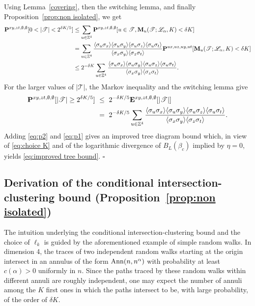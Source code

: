 \documentclass[a4paper,oneside,11pt]{article}
\numberwithin{equation}{section}
\numberwithin{equation}{section}
\numberwithin{equation}{section}
\newcommand{\calT}{\mathcal{T}}
\newcommand{\bbZ}{\mathbb{Z}}
\begin{document}
Using Lemma~\ref{covering}, then the switching lemma, and finally Proposition~\ref{prop:non isolated}, we get 
\begin{align} 
{\bf P}^{xy,zt,\emptyset,\emptyset}[0<|\calT|< 2^{\delta K/5}]
&\le \sum_{u\in \bbZ^4}{\bf P}^{xy,zt,\emptyset,\emptyset}[u\in \calT,{\bf M}_{u}(\calT; \mathcal L_\alpha, K)< \delta K]\nonumber\\
&= \sum_{u\in \bbZ^4}\frac{\langle\sigma_u\sigma_x\rangle\langle\sigma_u\sigma_y\rangle\langle\sigma_u\sigma_z\rangle\langle\sigma_u\sigma_t\rangle}{\langle\sigma_x\sigma_y\rangle\langle\sigma_z\sigma_t\rangle}{\bf P}^{ux,uz,uy,ut}[{\bf M}_{u}(\calT; \mathcal L_\alpha, K)< \delta K]\nonumber \\
&\le 2^{-\delta K} \sum_{u\in \bbZ^4}\frac{\langle\sigma_u\sigma_x\rangle\langle\sigma_u\sigma_y\rangle\langle\sigma_u\sigma_z\rangle\langle\sigma_u\sigma_t\rangle}{\langle\sigma_x\sigma_y\rangle\langle\sigma_z\sigma_t\rangle}.  \label{eq:p2}
\end{align}
For the larger values of $|\calT|$, the Markov inequality and the switching lemma give
\begin{align} {\bf P}^{xy,zt,\emptyset,\emptyset}[|\calT|\ge2^{\delta K/5}]
&~\leq~ 2^{-\delta K/5}{\bf E}^{xy,zt,\emptyset,\emptyset}[|\calT|] \notag \\ 
&~=~2^{-\delta K/5}\sum_{u\in \bbZ^4}\frac{\langle\sigma_u\sigma_x\rangle\langle\sigma_u\sigma_y\rangle\langle\sigma_u\sigma_z\rangle\langle\sigma_u\sigma_t\rangle}{\langle\sigma_x\sigma_y\rangle\langle\sigma_z\sigma_t\rangle}.\label{eq:p1}
\end{align} 
Adding \eqref{eq:p2} and \eqref{eq:p1} gives an improved tree diagram bound which, in view of \eqref{eq:choice K} and of the logarithmic divergence of $B_L(\beta_c)$ implied by $\eta=0$, yields \eqref{eq:improved tree bound}.  
\mbox{} \hfill\ensuremath{\square}

\subsection{Derivation of the conditional intersection-clustering bound (Proposition~\ref{prop:non isolated})} \label{sec:2.2}

The intuition underlying  the conditional intersection-clustering bound and the choice of $\ell_k$ is guided by the aforementioned  example of simple random walks. In dimension 4, the traces of two independent random walks starting at the origin intersect in an annulus of the form ${\rm Ann}(n,n^{\alpha})$ with probability at least $c(\alpha)>0$ uniformly in $n$.   Since the paths traced by these random walks within different annuli are roughly independent, one may expect the number of annuli among the $K$ first ones in which the paths intersect to be,  with large probability, of the order of $\delta K$.   
\end{document}

